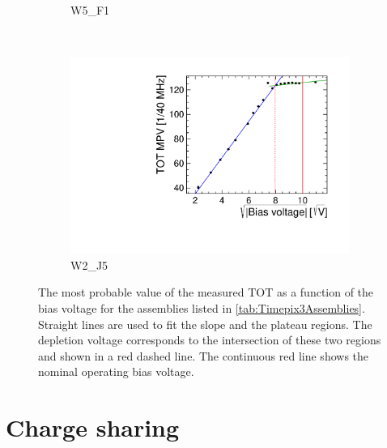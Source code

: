 \begin{figure}[htbp]
\begin{subfigure}[b]{0.33\textwidth}
    \caption{W5\_F1}
  \end{subfigure}\\
  \begin{subfigure}[b]{0.33\textwidth}
    \includegraphics[width=\textwidth]{./figures/TestBeam/depletionVoltage_W0002_J05.pdf}
    \caption{W2\_J5}
  \end{subfigure}
  \caption{The most probable value of the measured TOT as a function
    of the bias voltage for the assemblies listed in
    \cref{tab:Timepix3Assemblies}. Straight lines are used to fit the
    slope and the plateau regions. The depletion voltage corresponds
    to the intersection of these two regions and shown in a red dashed
    line. The continuous red line shows the nominal operating bias
    voltage.}
  \label{fig:depletionVoltage}
\end{figure}

\newpage
\section{Charge sharing}

